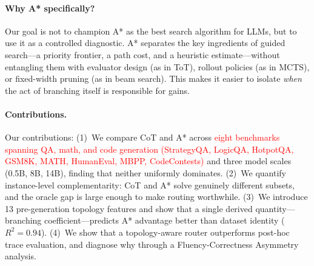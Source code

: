 \documentclass[10pt]{article}
\begin{document}


\paragraph{Why A* specifically?}
Our goal is not to champion A* as the best search algorithm for LLMs, but to use it as a controlled diagnostic. A* separates the key ingredients of guided search---a priority frontier, a path cost, and a heuristic estimate---without entangling them with evaluator design (as in ToT), rollout policies (as in MCTS), or fixed-width pruning (as in beam search). This makes it easier to isolate \emph{when} the act of branching itself is responsible for gains.

\paragraph{Contributions.}
Our contributions: (1)~We compare CoT and A* across \textcolor{red}{eight benchmarks spanning QA, math, and code generation (StrategyQA, LogicQA, HotpotQA, GSM8K, MATH, HumanEval, MBPP, CodeContests)} and three model scales (0.5B, 8B, 14B), finding that neither uniformly dominates. (2)~We quantify instance-level complementarity: CoT and A* solve genuinely different subsets, and the oracle gap is large enough to make routing worthwhile. (3)~We introduce 13 pre-generation topology features and show that a single derived quantity---branching coefficient---predicts A* advantage better than dataset identity ($R^2=0.94$). (4)~We show that a topology-aware router outperforms post-hoc trace evaluation, and diagnose why through a Fluency-Correctness Asymmetry analysis.
\end{document}
